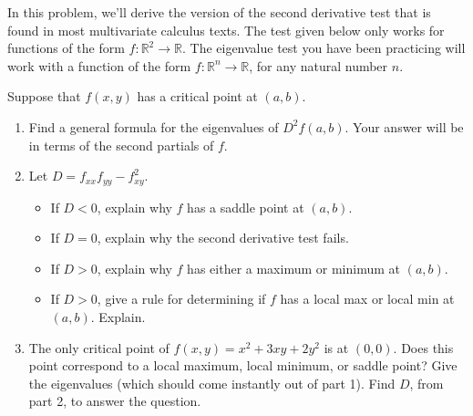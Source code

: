 
In this problem, we'll derive the version of the second derivative test that is found in most multivariate calculus texts.  The test given below only works for functions of the form $f:\mathbb{R}^2\to\mathbb{R}$.  The eigenvalue test you have been practicing will work with a function of the form  $f:\mathbb{R}^n\to\mathbb{R}$, for any natural number $n$. 
\begin{problem}[Optional]
 Suppose that $f(x,y)$ has a critical point at $(a,b)$. 
\begin{enumerate}
 \item Find a general formula for the eigenvalues of $D^2f(a,b)$. Your answer will be in terms of the second partials of $f$.
 \item Let $D=f_{xx}f_{yy}-f_{xy}^2$. 
\begin{itemize}
 \item If $D<0$, explain why $f$ has a saddle point at $(a,b)$.
 \item If $D=0$, explain why the second derivative test fails.
 \item If $D>0$, explain why $f$ has either a maximum or minimum at $(a,b)$.
 \item If $D>0$, give a rule for determining if $f$ has a local max or local min at $(a,b)$. Explain.
\end{itemize}
 \item The only critical point of $f(x,y) = x^2+3xy+2y^2$ is at $(0,0)$.  Does this point correspond to a local maximum, local minimum, or saddle point? Give the eigenvalues (which should come instantly out of part 1). Find $D$, from part 2, to answer the question.
\end{enumerate}

\end{problem}


